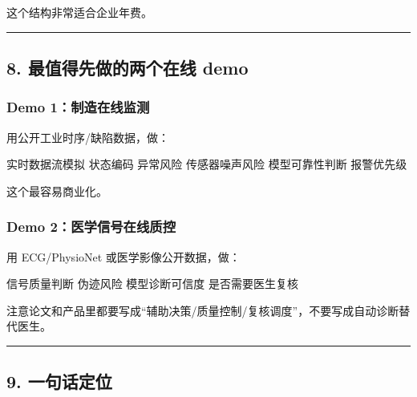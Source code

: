 \documentclass[
  12pt,
]{ctexart}
\newenvironment{Shaded}{}{}
\newcommand{\NormalTok}[1]{#1}
\begin{document}
这个结构非常适合企业年费。

\begin{center}\rule{0.5\linewidth}{0.5pt}\end{center}

\subsection{8. 最值得先做的两个在线
demo}\label{ux6700ux503cux5f97ux5148ux505aux7684ux4e24ux4e2aux5728ux7ebf-demo}

\subsubsection{Demo
1：制造在线监测}\label{demo-1ux5236ux9020ux5728ux7ebfux76d1ux6d4b}

用公开工业时序/缺陷数据，做：

\begin{Shaded}
\begin{Highlighting}[]
\NormalTok{实时数据流模拟}
\NormalTok{状态编码}
\NormalTok{异常风险}
\NormalTok{传感器噪声风险}
\NormalTok{模型可靠性判断}
\NormalTok{报警优先级}
\end{Highlighting}
\end{Shaded}

这个最容易商业化。

\subsubsection{Demo
2：医学信号在线质控}\label{demo-2ux533bux5b66ux4fe1ux53f7ux5728ux7ebfux8d28ux63a7}

用 ECG/PhysioNet 或医学影像公开数据，做：

\begin{Shaded}
\begin{Highlighting}[]
\NormalTok{信号质量判断}
\NormalTok{伪迹风险}
\NormalTok{模型诊断可信度}
\NormalTok{是否需要医生复核}
\end{Highlighting}
\end{Shaded}

注意论文和产品里都要写成``辅助决策/质量控制/复核调度''，不要写成自动诊断替代医生。

\begin{center}\rule{0.5\linewidth}{0.5pt}\end{center}

\subsection{9. 一句话定位}\label{ux4e00ux53e5ux8bddux5b9aux4f4d}
\end{document}
